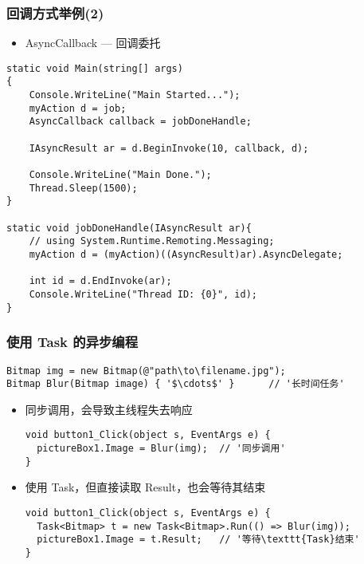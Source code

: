 \begin{frame}[fragile]
\frametitle{回调方式举例(2)}
\begin{itemize}
\item AsyncCallback --- 回调委托
\end{itemize}
\lstset{basicstyle=\scriptsize\ttfamily}
\begin{lstlisting}
static void Main(string[] args)
{
    Console.WriteLine("Main Started...");
    myAction d = job;
    AsyncCallback callback = jobDoneHandle;

    IAsyncResult ar = d.BeginInvoke(10, callback, d);

    Console.WriteLine("Main Done.");
    Thread.Sleep(1500);
}

static void jobDoneHandle(IAsyncResult ar){
    // using System.Runtime.Remoting.Messaging;
    myAction d = (myAction)((AsyncResult)ar).AsyncDelegate;

    int id = d.EndInvoke(ar);
    Console.WriteLine("Thread ID: {0}", id);
}
\end{lstlisting}
\end{frame}

\begin{frame}[fragile,t]
\frametitle{使用 Task 的异步编程}
\begin{lstlisting}[escapeinside='']
Bitmap img = new Bitmap(@"path\to\filename.jpg");
Bitmap Blur(Bitmap image) { '$\cdots$' }      // '长时间任务'
\end{lstlisting}
\begin{itemize}
\item 同步调用，会导致主线程失去响应
\begin{lstlisting}[escapeinside='']
void button1_Click(object s, EventArgs e) {
  pictureBox1.Image = Blur(img);  // '同步调用'
}
\end{lstlisting}
\item 使用 Task，但直接读取 Result，也会等待其结束
\begin{lstlisting}[escapeinside='']
void button1_Click(object s, EventArgs e) {
  Task<Bitmap> t = new Task<Bitmap>.Run(() => Blur(img));
  pictureBox1.Image = t.Result;   // '等待\texttt{Task}结束'
}
\end{lstlisting}
\end{itemize}
\end{frame}

